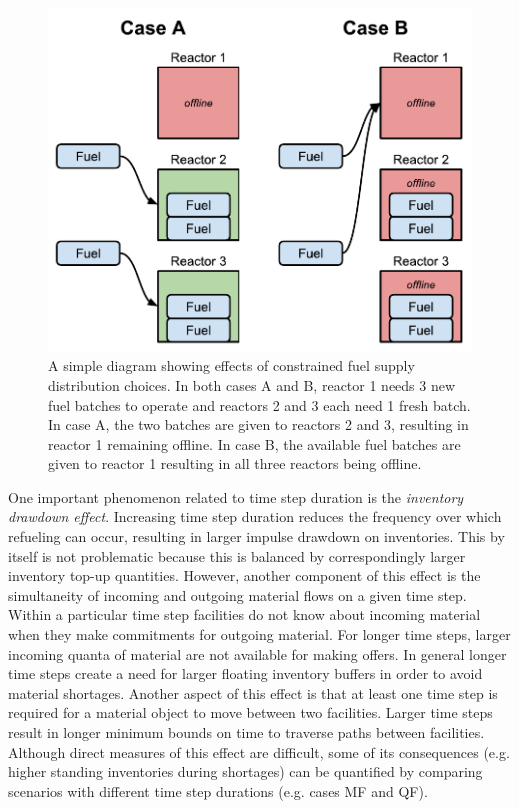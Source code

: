 \documentclass{style}
\begin{document}
\begin{figure}[h]
    \centering
    \includegraphics[width=0.8\columnwidth]{exp2/fuel-sharing.pdf}
    \caption[The fuel sharing effect]{
        A simple diagram showing effects of constrained fuel supply
        distribution choices. In both cases A and B, reactor 1 needs 3 new
        fuel batches to operate and reactors 2 and 3 each need 1 fresh batch.
        In case A, the two batches are given to reactors 2 and 3, resulting in
        reactor 1 remaining offline. In case B, the available fuel batches are
        given to reactor 1 resulting in all three reactors being offline.
    }
    \label{fig:fuel-sharing}
\end{figure}


One important phenomenon related to time step duration is the \emph{inventory
drawdown effect}.  Increasing time step duration reduces the frequency over
which refueling can occur, resulting in larger impulse drawdown on
inventories. This by itself is not problematic because this is balanced by
correspondingly larger inventory top-up quantities.  However, another
component of this effect is the simultaneity of incoming and outgoing material
flows on a given time step.  Within a particular time step facilities do not
know about incoming material when they make commitments for outgoing material.
For longer time steps, larger incoming quanta of material are not available
for making offers. In general longer time steps create a need for larger
floating inventory buffers in order to avoid material shortages.  Another
aspect of this effect is that at least one time step is required for a
material object to move between two facilities. Larger time steps result in
longer minimum bounds on time to traverse paths between facilities. Although
direct measures of this effect are difficult, some of its consequences (e.g.
higher standing inventories during shortages) can be quantified by comparing
scenarios with different time step durations (e.g.  cases MF and QF).
\end{document}
